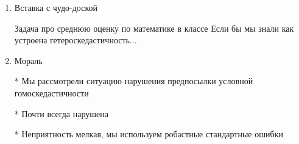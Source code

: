 \documentclass[12pt,a4paper]{article}
\begin{document}
{\begin{enumerate}
\item Вставка с чудо-доской

Задача про среднюю оценку по математике в классе
Если бы мы знали как устроена гетероскедастичность...


\item Мораль

* Мы рассмотрели ситуацию нарушения предпосылки условной гомоскедастичности

* Почти всегда нарушена
 
* Неприятность мелкая, мы используем робастные стандартные ошибки







 

 




\end{enumerate}





} %
\end{document}
